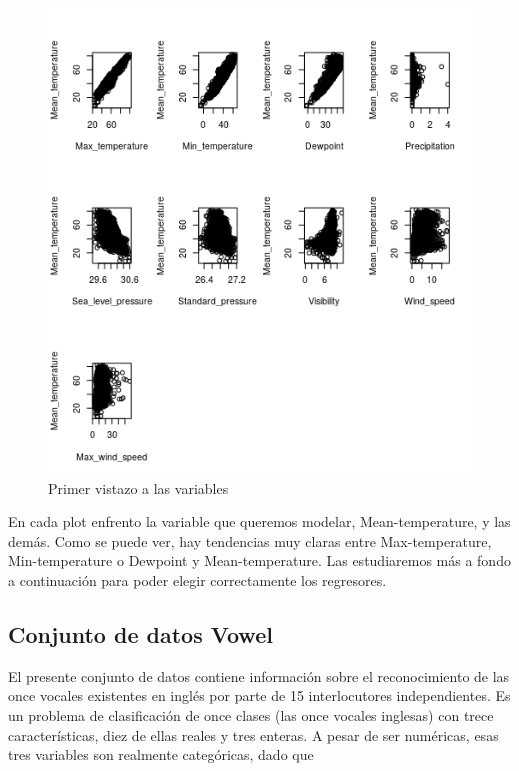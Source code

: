 \begin{figure}[H] %
	\centering
	\includegraphics[scale=0.7]{primer-vistazo-wankara.png}  %
	\caption{Primer vistazo a las variables} 
	\label{fig:pvwankara}
\end{figure}

En cada plot enfrento la variable que queremos modelar, Mean-temperature, y las demás. Como se puede ver, hay tendencias muy claras entre Max-temperature, Min-temperature o Dewpoint y Mean-temperature. Las estudiaremos más a fondo a continuación para poder elegir correctamente los regresores.



\newpage
\subsection{Conjunto de datos Vowel}

El presente conjunto de datos contiene información sobre el reconocimiento de las once vocales existentes en inglés por parte de 15 interlocutores independientes. Es un problema de clasificación de once clases (las once vocales inglesas) con trece características, diez de ellas reales y tres enteras. A pesar de ser numéricas, esas tres variables son realmente categóricas, dado que

